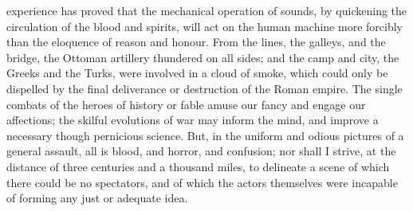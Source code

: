 experience has proved that the mechanical operation of sounds, by quickening the circulation of the blood and spirits, will act on the human machine more forcibly than the eloquence of reason and honour. From the lines, the galleys, and the bridge, the Ottoman artillery thundered on all sides; and the camp and city, the Greeks and the Turks, were involved in a cloud of smoke, which could only be dispelled by the final deliverance or destruction of the Roman empire. The single combats of the heroes of history or fable amuse our fancy and engage our affections; the skilful evolutions of war may inform the mind, and improve a necessary though pernicious science. But, in the uniform and odious pictures of a general assault, all is blood, and horror, and confusion; nor shall I strive, at the distance of three centuries and a thousand miles, to delineate a scene of which there could be no spectators, and of which the actors themselves were incapable of forming any just or adequate idea.

